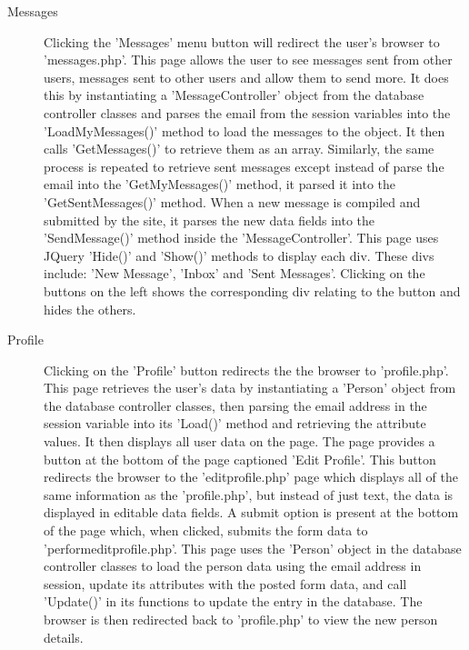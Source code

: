 \begin{description}
		\item[Messages] Clicking the 'Messages' menu button will redirect the user's browser to 'messages.php'. This page allows the user to see messages sent from other users, messages sent to other users and allow them to send more. It does this by instantiating a 'Message\textunderscore Controller' object from the database controller classes and parses the email from the session variables into the 'LoadMyMessages()' method to load the messages to the object. It then calls 'GetMessages()' to retrieve them as an array. Similarly, the same process is repeated to retrieve sent messages except instead of parse the email into the 'GetMyMessages()' method, it parsed it into the 'GetSentMessages()' method. When a new message is compiled and submitted by the site, it parses the new data fields into the 'SendMessage()' method inside the 'Message\textunderscore Controller'. This page uses JQuery 'Hide()' and 'Show()' methods to display each div. These divs include: 'New Message', 'Inbox' and 'Sent Messages'. Clicking on the buttons on the left shows the corresponding div relating to the button and hides the others.

		\item[Profile] Clicking on the 'Profile' button redirects the the browser to 'profile.php'. This page retrieves the user's data by instantiating a 'Person' object from the database controller classes, then parsing the email address in the session variable into its 'Load()' method and retrieving the attribute values. It then displays all user data on the page. The page provides a button at the bottom of the page captioned 'Edit Profile'. This button redirects the browser to the 'edit\textunderscore profile.php' page which displays all of the same information as the 'profile.php', but instead of just text, the data is displayed in editable data fields. A submit option is present at the bottom of the page which, when clicked, submits the form data to 'perform\textunderscore edit\textunderscore profile.php'. This page uses the 'Person' object in the database controller classes to load the person data using the email address in session, update its attributes with the posted form data, and call 'Update()' in its functions to update the entry in the database. The browser is then redirected back to 'profile.php' to view the new person details.


\end{description}
